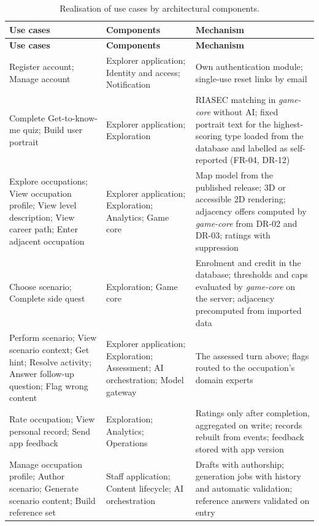 {\small{}\renewcommand{\arraystretch}{1.1}
\begin{longtable}{|>{\raggedright\arraybackslash}p{}|>{\raggedright\arraybackslash}p{}|>{\raggedright\arraybackslash}p{}|}
\caption{Realisation of use cases by architectural components.} \\
\hline
\textbf{Use cases} & \textbf{Components} & \textbf{Mechanism} \\ \hline
\endfirsthead
\hline
\textbf{Use cases} & \textbf{Components} & \textbf{Mechanism} \\ \hline
\endhead
Register account; Manage account & Explorer application; Identity and access; Notification & Own authentication module; single-use reset links by email \\ \hline
Complete Get-\allowbreak{}to-\allowbreak{}know-\allowbreak{}me quiz; Build user portrait & Explorer application; Exploration & RIASEC matching in \textit{game-core} without AI; fixed portrait text for the highest-\allowbreak{}scoring type loaded from the database and labelled as self-\allowbreak{}reported (FR-04, DR-12) \\ \hline
Explore occupations; View occupation profile; View level description; View career path; Enter adjacent occupation & Explorer application; Exploration; Analytics; Game core & Map model from the published release; 3D or accessible 2D rendering; adjacency offers computed by \textit{game-core} from DR-02 and DR-03; ratings with suppression \\ \hline
Choose scenario; Complete side quest & Exploration; Game core & Enrolment and credit in the database; thresholds and caps evaluated by \textit{game-core} on the server; adjacency precomputed from imported data \\ \hline
Perform scenario; View scenario context; Get hint; Resolve activity; Answer follow-up question; Flag wrong content & Explorer application; Exploration; Assessment; AI orchestration; Model gateway & The assessed turn above; flags routed to the occupation's domain experts \\ \hline
Rate occupation; View personal record; Send app feedback & Exploration; Analytics; Operations & Ratings only after completion, aggregated on write; records rebuilt from events; feedback stored with app version \\ \hline
Manage occupation profile; Author scenario; Generate scenario content; Build reference set & Staff application; Content lifecycle; AI orchestration & Drafts with authorship; generation jobs with history and automatic validation; reference answers validated on entry \\ \hline

\end{longtable}}
